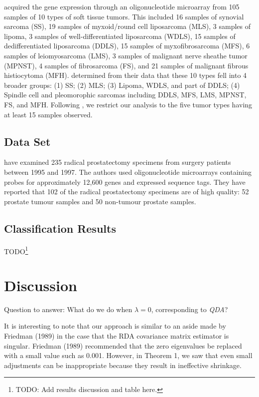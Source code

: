 \documentclass[11pt]{article}
\begin{document}
\cite{Nakayama:2007fl} acquired the gene expression through an oligonucleotide microarray from 105 samples of 10 types of soft tissue tumors. This included 16 samples of synovial sarcoma (SS), 19 samples of myxoid/round cell liposarcoma (MLS), 3 samples of lipoma, 3 samples of well-differentiated liposarcoma (WDLS), 15 samples of dedifferentiated liposarcoma (DDLS), 15 samples of myxofibrosarcoma (MFS), 6 samples of leiomyosarcoma (LMS), 3 samples of malignant nerve sheathe tumor (MPNST), 4 samples of fibrosarcoma (FS), and 21 samples of malignant fibrous histiocytoma (MFH). \cite{Nakayama:2007fl} determined from their data that these 10 types fell into 4 broader groups: (1) SS; (2) MLS; (3) Lipoma, WDLS, and part of DDLS; (4) Spindle cell and pleomorophic sarcomas including DDLS, MFS, LMS, MPNST, FS, and MFH. Following \cite{Witten:2011kc}, we restrict our analysis to the five tumor types having at least 15 samples observed.

\subsection{\cite{Singh:2002fh} Data Set}

\cite{Singh:2002fh} have examined 235 radical prostatectomy specimens from surgery patients between 1995 and 1997. The authors used oligonucleotide microarrays containing probes for approximately 12,600 genes and expressed sequence tags. They have reported that 102 of the radical prostatectomy specimens are of high quality: 52 prostate tumour samples and 50 non-tumour prostate samples.

\subsection{Classification Results}

TODO\footnote{TODO: Add results discussion and table here.}


\section{Discussion}

Question to answer: What do we do when $\lambda = 0$, corresponding to \emph{QDA}?

It is interesting to note that our approach is similar to an aside made by Friedman (1989) in the case that the RDA covariance matrix estimator is singular. Friedman (1989) recommended that the zero eigenvalues be replaced with a small value such as 0.001. However, in Theorem 1, we saw that even small adjustments can be inappropriate because they result in ineffective shrinkage.
	



\end{document}
